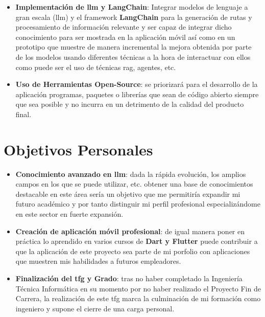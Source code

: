 \begin{itemize}
    \item \textbf{Implementación de \acrfull{llm} y \textbf{LangChain}}: Integrar modelos de lenguaje a gran escala (\acrshort{llm}) y el framework \textbf{LangChain} para la generación de rutas y procesamiento de información relevante y ser capaz de integrar dicho conocimiento para ser mostrada en la aplicación móvil así como en un prototipo que muestre de manera incremental la mejora obtenida por parte de los modelos usando diferentes técnicas a la hora de interactuar con ellos como puede ser el uso de técnicas \acrfull{rag}, agentes, etc.
    \item \textbf{Uso de Herramientas Open-Source}: se priorizará para el desarrollo de la aplicación programas, paquetes o librerías que sean de código abierto siempre que sea posible y no incurra en un detrimento de la calidad del producto final.
\end{itemize}

\section{Objetivos Personales}

\begin{itemize}
	\item \textbf{Conocimiento avanzado en \acrshort{llm}}: dada la rápida evolución, los amplios campos en los que se puede utilizar, etc. obtener una base de conocimientos destacable en este área sería un objetivo que me permitiría expandir mi futuro académico y por tanto distinguir mi perfil profesional especializándome en este sector en fuerte expansión.
	\item \textbf{Creación de aplicación móvil profesional}: de igual manera poner en práctica lo aprendido en varios cursos de \textbf{Dart y Flutter} puede contribuir a que la aplicación de este proyecto sea parte de mi porfolio con aplicaciones que muestren mis habilidades a futuros empleadores.
	\item \textbf{Finalización del \acrshort{tfg} y Grado}: tras no haber completado la Ingeniería Técnica Informática en su momento por no haber realizado el Proyecto Fin de Carrera, la realización de este \acrshort{tfg} marca la culminación de mi formación como ingeniero y supone el cierre de una carga personal.
\end{itemize}
